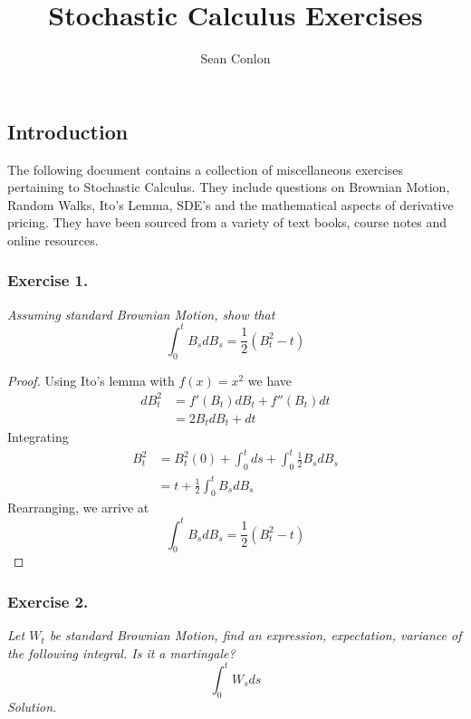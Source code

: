 \documentclass{article}
\title{Stochastic Calculus Exercises}
\author{Sean Conlon}
\begin{document}
\maketitle

\subsection*{Introduction}
The following document contains a collection of miscellaneous exercises pertaining to Stochastic Calculus. They include questions on Brownian Motion, Random Walks, Ito's Lemma, SDE's and the mathematical aspects of derivative pricing. They have been sourced from a variety of text books, course notes and online resources. \\

\subsubsection*{Exercise 1.}
\textit{Assuming standard Brownian Motion, show that $$\int_{0}^{t}B_s dB_s = \frac{1}{2}(B_t^2 - t)$$}
\begin{proof}
Using Ito's lemma with $f(x)=x^2$ we have
\begin{align*}
    dB_t^2 &= f'(B_t)dB_t + f''(B_t)dt \\
    &= 2B_tdB_t + dt
\end{align*}
Integrating
\begin{align*}
    B_t^2 &= B_t^2(0) + \int_{0}^{t}ds + \int_{0}^{t}\frac{1}{2}B_s dB_s \\
    &= t + \frac{1}{2}\int_{0}^{t}B_s dB_s
\end{align*}
Rearranging, we arrive at $$\int_{0}^{t}B_s dB_s = \frac{1}{2}(B_t^2 - t)$$
\end{proof}

\subsubsection*{Exercise 2.}
\textit{Let $W_t$ be standard Brownian Motion, find an expression, expectation, variance of the following integral. Is it a martingale? 
$$\int_{0}^{t}W_s ds$$}
\textit{Solution.}
\end{document}
